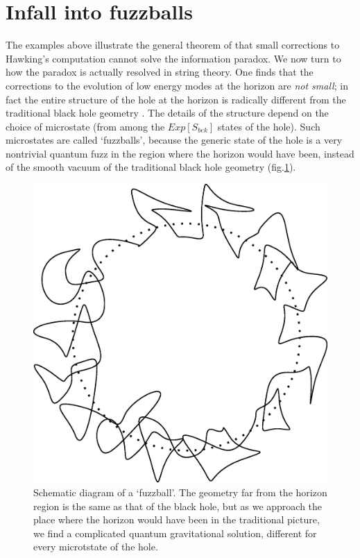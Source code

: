 \documentclass[11pt]{article}
\begin{document}
\section{Infall into fuzzballs}

The examples above illustrate the general theorem of \cite{mathurfuzz} that small corrections to Hawking's computation cannot solve the information paradox. We now turn to how the paradox is actually resolved in string theory. One finds that the corrections to the evolution of low energy modes at the horizon are {\it not small}; in fact the entire structure of the hole at the horizon is radically different from the traditional black hole geometry \cite{fuzzball1,fuzzball2}. The details of the structure depend on the choice of microstate (from among the $Exp[S_{bek}]$ states of the hole). Such microstates are called `fuzzballs', because the generic state of the hole is a very nontrivial quantum fuzz in the region where the horizon would have been, instead of the smooth vacuum of the traditional black hole geometry (fig.\ref{ftwop}).

\begin{figure}[htbp]
\begin{center}
\includegraphics[scale=.25]{ftwop.eps}
\caption{Schematic diagram of a `fuzzball'. The geometry far from the horizon region is the same as that of the black hole, but as we approach the place where the horizon would have been in the traditional picture,  we find a complicated quantum gravitational solution, different for every microtstate of the hole.}
\label{ftwop}
\end{center}
\end{figure}
\end{document}
